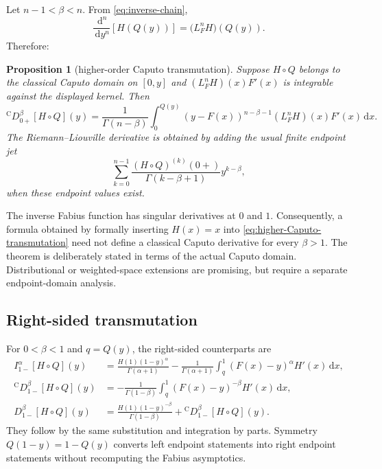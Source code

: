 \documentclass[11pt,oneside]{article}
\numberwithin{equation}{section}
\theoremstyle{plain}
\newtheorem{proposition}[theorem]{Proposition}
\theoremstyle{definition}
\theoremstyle{remark}
\newcommand{\dd}{\,\mathrm d}
\newcommand{\Ccap}{\mathrm C}
\begin{document}
Let $n-1<\beta<n$.  From \cref{eq:inverse-chain},
\begin{equation}
 \frac{\dd^n}{\dd y^n}[H(Q(y))]
 =\bigl(L_F^nH\bigr)(Q(y)).
\end{equation}
Therefore:

\begin{proposition}[higher-order Caputo transmutation]
Suppose $H\circ Q$ belongs to the classical Caputo domain on $[0,y]$ and
$(L_F^nH)(x)F'(x)$ is integrable against the displayed kernel.  Then
\begin{equation}
 {}^{\Ccap}D_{0+}^\beta[H\circ Q](y)
 =\frac1{\Gamma(n-\beta)}
  \int_0^{Q(y)}(y-F(x))^{n-\beta-1}
  (L_F^nH)(x)F'(x)\dd x.
 \label{eq:higher-Caputo-transmutation}
\end{equation}
The Riemann--Liouville derivative is obtained by adding the usual finite
endpoint jet
\begin{equation}
 \sum_{k=0}^{n-1}
 \frac{(H\circ Q)^{(k)}(0+)}{\Gamma(k-\beta+1)}y^{k-\beta},
 \label{eq:higher-RL-jet}
\end{equation}
when these endpoint values exist.
\end{proposition}

\begin{warningbox}
The inverse Fabius function has singular derivatives at $0$ and $1$.
Consequently, a formula obtained by formally inserting $H(x)=x$ into
\cref{eq:higher-Caputo-transmutation} need not define a classical Caputo
derivative for every $\beta>1$.  The theorem is deliberately stated in terms
of the actual Caputo domain.  Distributional or weighted-space extensions are
promising, but require a separate endpoint-domain analysis.
\end{warningbox}

\subsection{Right-sided transmutation}

For $0<\beta<1$ and $q=Q(y)$, the right-sided counterparts are
\begin{align}
 I_{1-}^\alpha[H\circ Q](y)
 &=\frac{H(1)(1-y)^\alpha}{\Gamma(\alpha+1)}
   -\frac1{\Gamma(\alpha+1)}
    \int_q^1(F(x)-y)^\alpha H'(x)\dd x,
 \label{eq:right-RL-transmutation}\\
 {}^{\Ccap}D_{1-}^\beta[H\circ Q](y)
 &=-\frac1{\Gamma(1-\beta)}
   \int_q^1(F(x)-y)^{-\beta}H'(x)\dd x,
 \label{eq:right-Caputo-transmutation}\\
 D_{1-}^\beta[H\circ Q](y)
 &=\frac{H(1)(1-y)^{-\beta}}{\Gamma(1-\beta)}
   +{}^{\Ccap}D_{1-}^\beta[H\circ Q](y).
 \label{eq:right-RL-Caputo}
\end{align}
They follow by the same substitution and integration by parts.  Symmetry
$Q(1-y)=1-Q(y)$ converts left endpoint statements into right endpoint
statements without recomputing the Fabius asymptotics.
\end{document}
